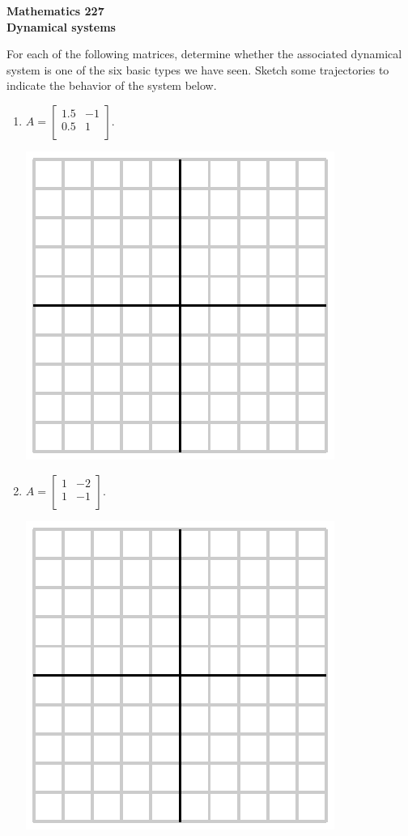 \documentclass[12pt]{article}
\begin{document}
\noindent
{\bf Mathematics 227} \\ 
{\bf Dynamical systems}

\bigskip For each of the following matrices, determine whether the
associated dynamical system is one of the six basic types we have
seen.  Sketch some trajectories to indicate the
behavior of the system below.

\begin{enumerate}
\item
  $A =
  \left[
    \begin{array}{cc}
      1.5 & -1 \\
      0.5 & 1 \\
    \end{array}
  \right].
  $

  \includegraphics{empty.eps}


\item
  $A =
  \left[
    \begin{array}{cc}
      1 & -2 \\
      1 & -1 \\
    \end{array}
  \right].
  $

  \includegraphics{empty.eps}
  

\end{enumerate}
\end{document}
